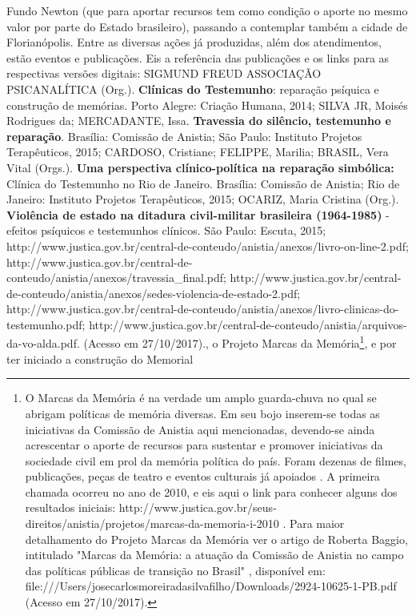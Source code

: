 {  Fundo Newton (que para aportar recursos tem como condição o aporte no
  mesmo valor por parte do Estado brasileiro), passando a contemplar
  também a cidade de Florianópolis. Entre as diversas ações já
  produzidas, além dos atendimentos, estão eventos e publicações. Eis a
  referência das publicações e os links para as respectivas versões
  digitais: SIGMUND FREUD ASSOCIAÇÃO PSICANALÍTICA (Org.).
  \textbf{Clínicas do Testemunho}: reparação psíquica e construção de
  memórias. Porto Alegre: Criação Humana, 2014; SILVA JR, Moisés
  Rodrigues da; MERCADANTE, Issa. \textbf{Travessia do silêncio,
  testemunho e reparação}. Brasília: Comissão de Anistia; São Paulo:
  Instituto Projetos Terapêuticos, 2015; CARDOSO, Cristiane; FELIPPE,
  Marilia; BRASIL, Vera Vital (Orgs.). \textbf{Uma perspectiva
  clínico-política na reparação simbólica:} Clínica do Testemunho no Rio
  de Janeiro. Brasília: Comissão de Anistia; Rio de Janeiro: Instituto
  Projetos Terapêuticos, 2015; OCARIZ, Maria Cristina (Org.).
  \textbf{Violência de estado na ditadura civil-militar brasileira
  (1964-1985)} - efeitos psíquicos e testemunhos clínicos. São Paulo:
  Escuta, 2015;
  http://www.justica.gov.br/central-de-conteudo/anistia/anexos/livro-on-line-2.pdf;
  http://www.justica.gov.br/central-de-conteudo/anistia/anexos/travessia\_final.pdf;
  http://www.justica.gov.br/central-de-conteudo/anistia/anexos/sedes-violencia-de-estado-2.pdf;
  http://www.justica.gov.br/central-de-conteudo/anistia/anexos/livro-clinicas-do-testemunho.pdf;
  http://www.justica.gov.br/central-de-conteudo/anistia/arquivos-da-vo-alda.pdf.
  (Acesso em 27/10/2017).}, o Projeto Marcas da Memória\footnote{O
  Marcas da Memória é na verdade um amplo guarda-chuva no qual se
  abrigam políticas de memória diversas. Em seu bojo inserem-se todas as
  iniciativas da Comissão de Anistia aqui mencionadas, devendo-se ainda
  acrescentar o aporte de recursos para sustentar e promover iniciativas
  da sociedade civil em prol da memória política do país. Foram dezenas
  de filmes, publicações, peças de teatro e eventos culturais já
  apoiados . A primeira chamada ocorreu no ano de 2010, e eis aqui o
  link para conhecer alguns dos resultados iniciais:
  http://www.justica.gov.br/seus-direitos/anistia/projetos/marcas-da-memoria-i-2010
  . Para maior detalhamento do Projeto Marcas da Memória ver o artigo de
  Roberta Baggio, intitulado "Marcas da Memória: a atuação da Comissão
  de Anistia no campo das políticas públicas de transição no Brasil" ,
  disponível em:
  file:///Users/josecarlosmoreiradasilvafilho/Downloads/2924-10625-1-PB.pdf
  (Acesso em 27/10/2017).}, e por ter iniciado a construção do Memorial
